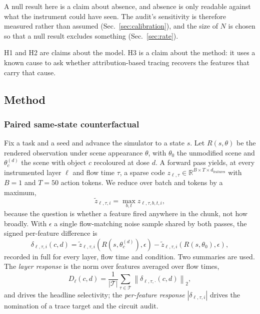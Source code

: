 A null result here is a claim about absence, and absence is only readable
against what the instrument could have seen. The audit's sensitivity is
therefore measured rather than assumed (Sec.~\ref{sec:calibration}), and the
size of $N$ is chosen so that a null result excludes something
(Sec.~\ref{sec:rate}).

H1 and H2 are claims about the model. H3 is a claim about the method: it uses a
known cause to ask whether attribution-based tracing recovers the features that
carry that cause.

\subsection{Method}

\subsubsection{Paired same-state counterfactual}

Fix a task and a seed and advance the simulator to a state $s$. Let
$R(s,\theta)$ be the rendered observation under scene appearance $\theta$, with
$\theta_0$ the unmodified scene and $\theta_c^{(d)}$ the scene with object $c$
recoloured at dose $d$. A forward pass yields, at every instrumented layer
$\ell$ and flow time $\tau$, a sparse code $z_{\ell,\tau}\in\mathbb{R}^{B\times
T\times d_{\mathrm{features}}}$ with $B=1$ and $T=50$ action tokens. We reduce
over batch and tokens by a maximum,
\begin{equation}
\tilde{z}_{\ell,\tau,i} = \max_{b,t} z_{\ell,\tau,b,t,i},
\label{eq:reduce}
\end{equation}
because the question is whether a feature fired anywhere in the chunk, not how
broadly. With $\epsilon$ a single flow-matching noise sample shared by both
passes, the signed per-feature difference is
\begin{equation}
\delta_{\ell,\tau,i}(c,d)
=
\tilde{z}_{\ell,\tau,i}\!\left(R(s,\theta_c^{(d)}),\epsilon\right)
-
\tilde{z}_{\ell,\tau,i}\!\left(R(s,\theta_0),\epsilon\right),
\label{eq:delta}
\end{equation}
recorded in full for every layer, flow time and condition. Two summaries are
used. The \emph{layer response} is the norm over features averaged over flow
times,
\begin{equation}
D_{\ell}(c,d) = \frac{1}{|\mathcal{T}|}\sum_{\tau\in\mathcal{T}}
\left\lVert \delta_{\ell,\tau,\cdot}(c,d) \right\rVert_2 ,
\label{eq:layer-response}
\end{equation}
and drives the headline selectivity; the \emph{per-feature response}
$|\delta_{\ell,\tau,i}|$ drives the nomination of a trace target and the
circuit audit.


